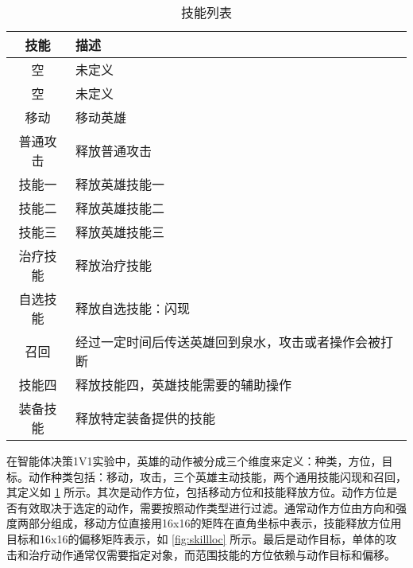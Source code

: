 \begin{table}[ht]
    \centering
    \begin{tabular}{|c|l|} \hline
        \bf 技能 & \bf 描述                                             \\ \hline
        空       & 未定义                                               \\ \hline
        空       & 未定义                                               \\ \hline
        移动     & 移动英雄                                             \\ \hline
        普通攻击 & 释放普通攻击                                         \\ \hline
        技能一   & 释放英雄技能一                                       \\ \hline
        技能二   & 释放英雄技能二                                       \\ \hline
        技能三   & 释放英雄技能三                                       \\ \hline
        治疗技能 & 释放治疗技能                                         \\ \hline
        自选技能 & 释放自选技能：闪现                                   \\ \hline
        召回     & 经过一定时间后传送英雄回到泉水，攻击或者操作会被打断 \\ \hline
        技能四   & 释放技能四，英雄技能需要的辅助操作                   \\ \hline
        装备技能 & 释放特定装备提供的技能                               \\ \hline
    \end{tabular}
    \caption{技能列表} \label{tab:actions}
\end{table}


在智能体决策1V1实验中，英雄的动作被分成三个维度来定义：种类，方位，目标。动作种类包括：移动，攻击，三个英雄主动技能，两个通用技能闪现和召回，其定义如 \cref{tab:actions} 所示。其次是动作方位，包括移动方位和技能释放方位。动作方位是否有效取决于选定的动作，需要按照动作类型进行过滤。通常动作方位由方向和强度两部分组成，移动方位直接用16x16的矩阵在直角坐标中表示，技能释放方位用目标和16x16的偏移矩阵表示，如 \cref{fig:skillloc} 所示。最后是动作目标，单体的攻击和治疗动作通常仅需要指定对象，而范围技能的方位依赖与动作目标和偏移。

